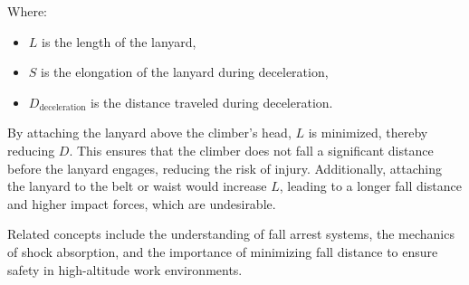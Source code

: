Where:
\begin{itemize}
    \item \( L \) is the length of the lanyard,
    \item \( S \) is the elongation of the lanyard during deceleration,
    \item \( D_{\text{deceleration}} \) is the distance traveled during deceleration.
\end{itemize}

By attaching the lanyard above the climber’s head, \( L \) is minimized, thereby reducing \( D \). This ensures that the climber does not fall a significant distance before the lanyard engages, reducing the risk of injury. Additionally, attaching the lanyard to the belt or waist would increase \( L \), leading to a longer fall distance and higher impact forces, which are undesirable.

Related concepts include the understanding of fall arrest systems, the mechanics of shock absorption, and the importance of minimizing fall distance to ensure safety in high-altitude work environments.


